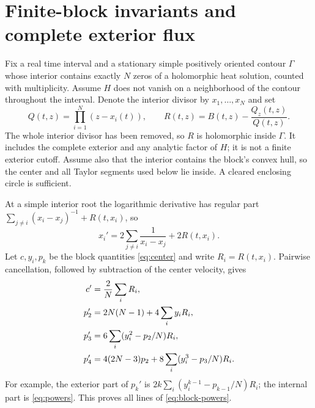 \section{Finite-block invariants and complete exterior flux}
\label{sec:block}

Fix a real time interval and a stationary simple positively oriented
contour $\Gamma$ whose interior contains exactly $N$ zeros of a
holomorphic heat solution, counted with multiplicity. Assume $H$
does not vanish on a neighborhood of the contour throughout the
interval. Denote the interior divisor by $x_1,\ldots,x_N$ and set
\begin{equation}
 Q(t,z)=\prod_{i=1}^N(z-x_i(t)),\qquad
 R(t,z)=B(t,z)-\frac{Q_z(t,z)}{Q(t,z)}.
 \label{eq:exterior}
\end{equation}
The whole interior divisor has been removed, so $R$ is holomorphic
inside $\Gamma$. It includes the complete exterior and any analytic
factor of $H$; it is not a finite exterior cutoff. Assume also that
the interior contains the block's convex hull, so the center and all
Taylor segments used below lie inside. A cleared enclosing circle
is sufficient.

At a simple interior root the logarithmic derivative has regular
part $\sum_{j\ne i}(x_i-x_j)^{-1}+R(t,x_i)$, so
\begin{equation}
 x_i'=2\sum_{j\ne i}\frac1{x_i-x_j}+2R(t,x_i).
 \label{eq:block-roots}
\end{equation}
Let $c,y_i,p_k$ be the block quantities \eqref{eq:center} and
write $R_i=R(t,x_i)$. Pairwise cancellation, followed by subtraction
of the center velocity, gives
\begin{align}
 c'&=\frac2N\sum_iR_i, \label{eq:center-flux}\\
 p_2'&=2N(N-1)+4\sum_i y_iR_i,\notag\\
 p_3'&=6\sum_i(y_i^2-p_2/N)R_i,\notag\\
 p_4'&=4(2N-3)p_2+8\sum_i(y_i^3-p_3/N)R_i.
 \label{eq:block-powers}
\end{align}
For example, the exterior part of $p_k'$ is
$2k\sum_i(y_i^{k-1}-p_{k-1}/N)R_i$; the internal part is
\eqref{eq:powers}. This proves all lines of
\eqref{eq:block-powers}.

